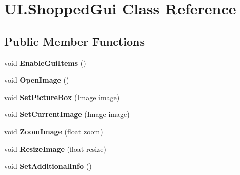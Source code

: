 \hypertarget{class_u_i_1_1_shopped_gui}{
\section{UI.ShoppedGui Class Reference}
\label{class_u_i_1_1_shopped_gui}
}
\subsection*{Public Member Functions}
\begin{DoxyCompactItemize}
\item 
\hypertarget{class_u_i_1_1_shopped_gui_a9a54c136cc258deace90c6afb2249874}{
void {\bfseries EnableGuiItems} ()}
\label{class_u_i_1_1_shopped_gui_a9a54c136cc258deace90c6afb2249874}

\item 
\hypertarget{class_u_i_1_1_shopped_gui_a5a53ff8857e36117991156d267dc74f4}{
void {\bfseries OpenImage} ()}
\label{class_u_i_1_1_shopped_gui_a5a53ff8857e36117991156d267dc74f4}

\item 
\hypertarget{class_u_i_1_1_shopped_gui_abe26e4f1c98122536f63936ca8d26c25}{
void {\bfseries SetPictureBox} (Image image)}
\label{class_u_i_1_1_shopped_gui_abe26e4f1c98122536f63936ca8d26c25}

\item 
\hypertarget{class_u_i_1_1_shopped_gui_a36ca444ddfb9ba2312cf4bcd35ab2335}{
void {\bfseries SetCurrentImage} (Image image)}
\label{class_u_i_1_1_shopped_gui_a36ca444ddfb9ba2312cf4bcd35ab2335}

\item 
\hypertarget{class_u_i_1_1_shopped_gui_add911c1f67662901046a206b15650c56}{
void {\bfseries ZoomImage} (float zoom)}
\label{class_u_i_1_1_shopped_gui_add911c1f67662901046a206b15650c56}

\item 
\hypertarget{class_u_i_1_1_shopped_gui_a082c9df7bb362b1645e7cdc2d988e73f}{
void {\bfseries ResizeImage} (float resize)}
\label{class_u_i_1_1_shopped_gui_a082c9df7bb362b1645e7cdc2d988e73f}

\item 
\hypertarget{class_u_i_1_1_shopped_gui_a95e786417d11460cc86e53367743db17}{
void {\bfseries SetAdditionalInfo} ()}
\label{class_u_i_1_1_shopped_gui_a95e786417d11460cc86e53367743db17}

\end{DoxyCompactItemize}

